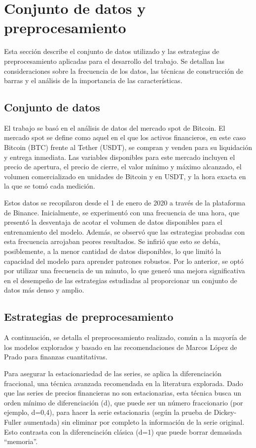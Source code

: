 \section{Conjunto de datos y preprocesamiento}

Esta sección describe el conjunto de datos utilizado y las estrategias de preprocesamiento aplicadas para el desarrollo del trabajo. Se detallan las consideraciones sobre la frecuencia de los datos, las técnicas de construcción de barras y el análisis de la importancia de las características.


\subsection{Conjunto de datos}

El trabajo se basó en el análisis de datos del mercado spot de Bitcoin. El mercado spot se define como aquel en el que los activos financieros, en este caso Bitcoin (BTC) frente al Tether (USDT), se compran y venden para su liquidación y entrega inmediata. Las variables disponibles para este mercado incluyen el precio de apertura, el precio de cierre, el valor mínimo y máximo alcanzado, el volumen comercializado en unidades de Bitcoin y en USDT, y la hora exacta en la que se tomó cada medición.

Estos datos se recopilaron desde el 1 de enero de 2020 a través de la plataforma de Binance. Inicialmente, se experimentó con una frecuencia de una hora, que presentó la desventaja de acotar el volumen de datos disponibles para el entrenamiento del modelo. Además, se observó que las estrategias probadas con esta frecuencia arrojaban peores resultados. Se infirió que esto se debía, posiblemente, a la menor cantidad de datos disponibles, lo que limitó la capacidad del modelo para aprender patrones robustos. Por lo anterior, se optó por utilizar una frecuencia de un minuto, lo que generó una mejora significativa en el desempeño de las estrategias estudiadas al proporcionar un conjunto de datos más denso y amplio.

\subsection{Estrategias de preprocesamiento}

A continuación, se detalla el preprocesamiento realizado, común a la mayoría de los modelos explorados y basado en las recomendaciones de Marcos López de Prado para finanzas cuantitativas.

  Para asegurar la estacionariedad de las series, se aplica la diferenciación fraccional, una técnica avanzada recomendada en la literatura explorada. Dado que las series de precios financieras no son estacionarias, esta técnica busca un orden mínimo de diferenciación (d), que puede ser un número fraccionario (por ejemplo, d=0,4), para hacer la serie estacionaria (según la prueba de Dickey-Fuller aumentada) sin eliminar por completo la información de la serie original. Esto contrasta con la diferenciación clásica (d=1) que puede borrar demasiada ``memoria''.

